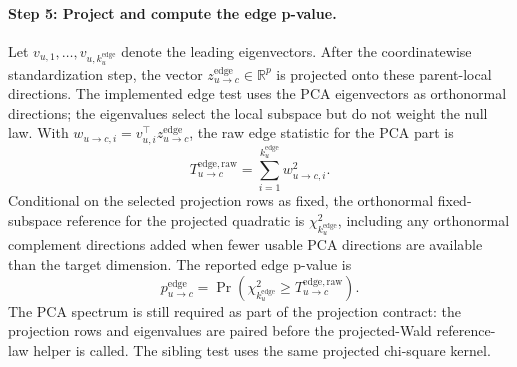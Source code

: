 \paragraph{Step 5: Project and compute the edge p-value.}
Let $v_{u,1},\dots,v_{u,k_u^{\mathrm{edge}}}$ denote the leading eigenvectors.
After the coordinatewise standardization step, the vector
$z_{u \to c}^{\mathrm{edge}} \in \mathbb{R}^p$ is projected onto these
parent-local directions. The implemented edge test uses the PCA eigenvectors as
orthonormal directions; the eigenvalues select the local subspace but do not
weight the null law. With
$w_{u \to c,i} = v_{u,i}^\top z_{u \to c}^{\mathrm{edge}}$, the raw edge
statistic for the PCA part is
\begin{equation}
T_{u \to c}^{\mathrm{edge,raw}}
=
\sum_{i=1}^{k_u^{\mathrm{edge}}}
w_{u \to c,i}^2.
\end{equation}
Conditional on the selected projection rows as fixed, the orthonormal
fixed-subspace reference for the projected quadratic is
$\chi^2_{k_u^{\mathrm{edge}}}$, including any orthonormal complement directions
added when fewer usable PCA directions are available than the target dimension.
The reported edge p-value is
\begin{equation}
p_{u \to c}^{\mathrm{edge}}
=
\Pr\!\left(
\chi^2_{k_u^{\mathrm{edge}}}
\ge
T_{u \to c}^{\mathrm{edge,raw}}
\right).
\end{equation}
The PCA spectrum is still required as part of the projection contract: the
projection rows and eigenvalues are paired before the projected-Wald
reference-law helper is called. The sibling test uses the same projected
chi-square kernel.
